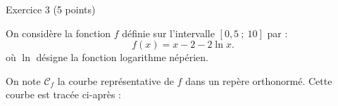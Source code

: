 
%
\begin{h2}Exercice 3 (5 points)\end{h2}
\par
On considère la fonction $f$ définie sur l'intervalle $[0,5~;~10]$ par :
\[ f(x)=x-2-2\ln x. \]
où $\ln$ désigne la fonction logarithme népérien.
\par
On note $\mathscr{C}_f$ la courbe représentative de $f$ dans un repère orthonormé. Cette courbe est tracée ci-après :
\par

\begin{center}
\end{center}

